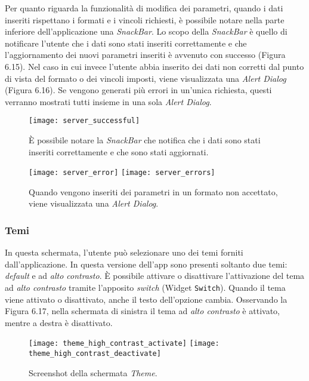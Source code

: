 Per quanto riguarda la funzionalità di modifica dei parametri, quando i dati inseriti rispettano i formati e i vincoli richiesti, è possibile notare nella parte inferiore dell'applicazione una \textit{SnackBar}. Lo scopo della \textit{SnackBar} è quello di notificare l'utente che i dati sono stati inseriti correttamente e che l'aggiornamento dei nuovi parametri inseriti è avvenuto con successo (Figura 6.15). Nel caso in cui invece l'utente abbia inserito dei dati non corretti dal punto di vista del formato o dei vincoli imposti, viene visualizzata una \textit{Alert Dialog} (Figura 6.16). Se vengono generati più errori in un'unica richiesta, questi verranno mostrati tutti insieme in una sola \textit{Alert Dialog}.
\begin{figure}
	\begin{center}
		\texttt{[image: server\_successful]}
		\caption[Screenshot - Salvataggio dei dati con successo nella schermata Server]{È possibile notare la \textit{SnackBar} che notifica che i dati sono stati inseriti correttamente e che sono stati aggiornati.}
		\label{figura:server_successful}
	\end{center}
\end{figure}

\begin{figure}[htp]
	\centering
	\texttt{[image: server\_error]}
	\texttt{[image: server\_errors]}
	\caption[Screenshot - Alert Dialog di errore nella schermata Server]{Quando vengono inseriti dei parametri in un formato non accettato, viene visualizzata una \textit{Alert Dialog}.}\label{xyz}
\end{figure}

\newpage

\subsubsection{Temi}
In questa schermata, l'utente può selezionare uno dei temi forniti dall'applicazione. In questa versione dell'app sono presenti soltanto due temi: \textit{default} e ad \textit{alto contrasto}.
È possibile attivare o disattivare l'attivazione del tema ad \textit{alto contrasto} tramite l'apposito \textit{switch} (Widget \verb|Switch|). Quando il tema viene attivato o disattivato, anche il testo dell'opzione cambia. Osservando la Figura 6.17, nella schermata di sinistra il tema ad \textit{alto contrasto} è attivato, mentre a destra è disattivato.

\begin{figure}[htp]
	\centering
	\texttt{[image: theme\_high\_contrast\_activate]}
	\texttt{[image: theme\_high\_contrast\_deactivate]}
	\caption[Screenshot - Schermata per la scelta del tema]{Screenshot della schermata \textit{Theme}.}\label{xyz}
\end{figure}

